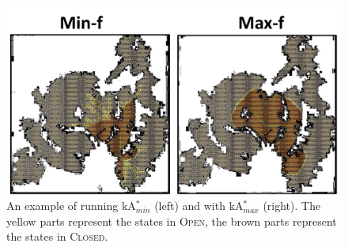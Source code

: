 \documentclass{aicom2e}
\newcommand{\astar}{A$^*$}
\newcommand{\kastar}{kA$^*$}
\newcommand{\kastarmin}{kA$^*_{min}$}
\newcommand{\kastarmax}{kA$^*_{max}$}
\newcommand{\kxastar}{k$\times$A$^*$}
\newcommand{\open}{\textsc{Open}}
\newcommand{\closed}{\textsc{Closed}}
\begin{document}


\begin{figure}
	\includegraphics[width=\columnwidth]{min-vs-max}
	\caption{An example of running \kastarmin{} (left) and with \kastarmax{} (right). The yellow parts represent the states in \open{}, the brown parts represent the states in \closed{}.}
	\label{fig:min-vs-max}
\end{figure}
\end{document}
